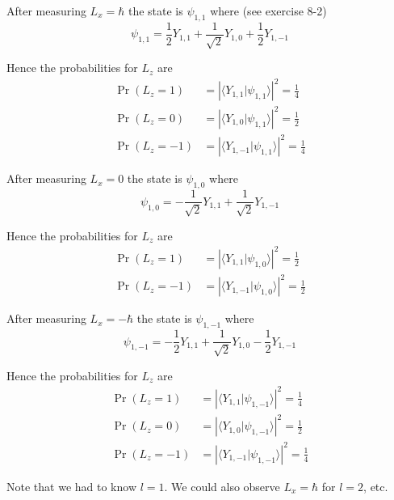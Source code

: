 


\bigskip
After measuring $L_x=\hbar$ the state is $\psi_{1,1}$ where (see exercise 8-2)
\begin{equation*}
\psi_{1,1}=\frac{1}{2}Y_{1,1}+\frac{1}{\sqrt2}Y_{1,0}+\frac{1}{2}Y_{1,-1}
\end{equation*}

Hence the probabilities for $L_z$ are
\begin{align*}
\Pr(L_z=1)&=\left|\langle Y_{1,1}|\psi_{1,1}\rangle\right|^2=\tfrac{1}{4}
\\[1ex]
\Pr(L_z=0)&=\left|\langle Y_{1,0}|\psi_{1,1}\rangle\right|^2=\tfrac{1}{2}
\\[1ex]
\Pr(L_z=-1)&=\left|\langle Y_{1,-1}|\psi_{1,1}\rangle\right|^2=\tfrac{1}{4}
\end{align*}

After measuring $L_x=0$ the state is $\psi_{1,0}$ where
\begin{equation*}
\psi_{1,0}=-\frac{1}{\sqrt2}Y_{1,1}+\frac{1}{\sqrt2}Y_{1,-1}
\end{equation*}

Hence the probabilities for $L_z$ are
\begin{align*}
\Pr(L_z=1)&=\left|\langle Y_{1,1}|\psi_{1,0}\rangle\right|^2=\tfrac{1}{2}
\\[1ex]
\Pr(L_z=-1)&=\left|\langle Y_{1,-1}|\psi_{1,0}\rangle\right|^2=\tfrac{1}{2}
\end{align*}

After measuring $L_x=-\hbar$ the state is $\psi_{1,-1}$ where
\begin{equation*}
\psi_{1,-1}=-\frac{1}{2}Y_{1,1}+\frac{1}{\sqrt2}Y_{1,0}-\frac{1}{2}Y_{1,-1}
\end{equation*}

Hence the probabilities for $L_z$ are
\begin{align*}
\Pr(L_z=1)&=\left|\langle Y_{1,1}|\psi_{1,-1}\rangle\right|^2=\tfrac{1}{4}
\\[1ex]
\Pr(L_z=0)&=\left|\langle Y_{1,0}|\psi_{1,-1}\rangle\right|^2=\tfrac{1}{2}
\\[1ex]
\Pr(L_z=-1)&=\left|\langle Y_{1,-1}|\psi_{1,-1}\rangle\right|^2=\tfrac{1}{4}
\end{align*}

Note that we had to know $l=1$.
We could also observe $L_x=\hbar$ for $l=2$, etc.


